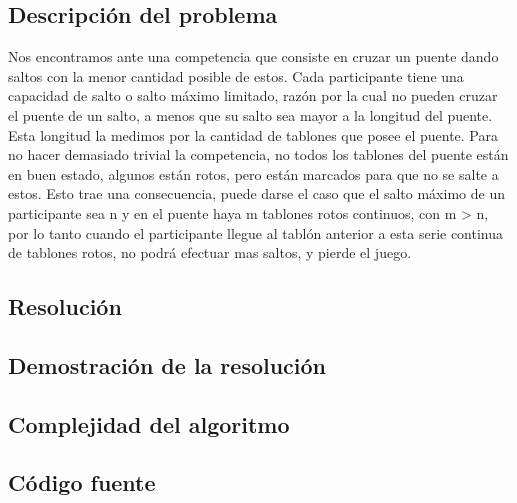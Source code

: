 \subsection{Descripci\'on del problema}

Nos encontramos ante una competencia que consiste en cruzar un puente dando saltos con la menor cantidad posible de estos.
Cada participante tiene una capacidad de salto o salto máximo limitado, razón por la cual no pueden cruzar el puente de un salto, a menos que su salto sea mayor a la longitud del puente. Esta longitud la medimos por la cantidad de tablones que posee el puente.
Para no hacer demasiado trivial la competencia, no todos los tablones del puente están en buen estado, algunos están rotos, pero están marcados para que no se salte a estos. Esto trae una consecuencia, puede darse el caso que el salto máximo de un participante sea n y en el puente haya m tablones rotos continuos, con m > n, por lo tanto cuando el participante llegue al tablón anterior a esta serie continua de tablones rotos, no podrá efectuar mas saltos, y pierde el juego. 

\subsection{Resoluci\'on}


\subsection{Demostraci\'on de la resoluci\'on}


\subsection{Complejidad del algoritmo}


\subsection{C\'odigo fuente}

